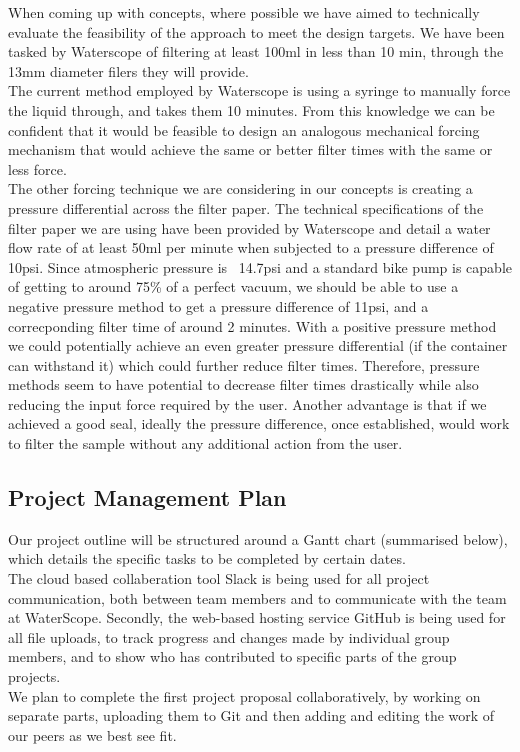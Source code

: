\documentclass[12pt]{article}
\begin{document}
When coming up with concepts, where possible we have aimed to technically evaluate the feasibility of the approach to meet the design targets. We have been tasked by Waterscope of filtering at least 100ml in less than 10 min, through the 13mm diameter filers they will provide. \\
The current method employed by Waterscope is using a syringe to manually force the liquid through, and takes them 10 minutes. From this knowledge we can be confident that it would be feasible to design an analogous mechanical forcing mechanism that would achieve the same or better filter times with the same or less force. \\
The other forcing technique we are considering in our concepts is creating a pressure differential across the filter paper. The technical specifications of the filter paper we are using have been provided by Waterscope and detail a water flow rate of at least 50ml per minute when subjected to a pressure difference of 10psi. Since atmospheric pressure is ~14.7psi and a standard bike pump is capable of getting to around 75\% of a perfect vacuum, we should be able to use a negative pressure method to get a pressure difference of 11psi, and a correcponding filter time of around 2 minutes. With a positive pressure method we could potentially achieve an even greater pressure differential (if the container can withstand it) which could further reduce filter times. Therefore, pressure methods seem to have potential to decrease filter times drastically while also reducing the input force required by the user. Another advantage is that if we achieved a good seal, ideally the pressure difference, once established, would work to filter the sample without any additional action from the user.  

\subsection{Project Management Plan}
Our project outline will be structured around a Gantt chart (summarised below), which details the specific tasks to be completed by certain dates.\\
The cloud based collaberation tool Slack is being used for all project communication, both between team members and to communicate with the team at WaterScope. Secondly, the web-based hosting service GitHub is being used for all file uploads, to track progress and changes made by individual group members, and to show who has contributed to specific parts of the group projects.\\
We plan to complete the first project proposal collaboratively, by working on separate parts, uploading them to Git and then adding and editing the work of our peers as we best see fit.
\end{document}
